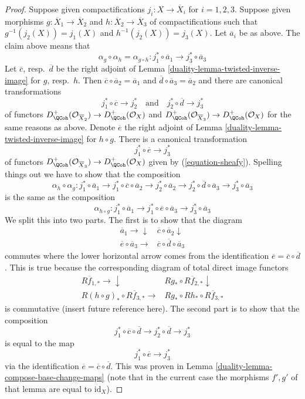 \begin{proof}
\medskip\noindent
Suppose given compactifications $j_i : X \to \overline{X}_i$
for $i = 1, 2, 3$.  Suppose given morphisms
$g : \overline{X}_1 \to \overline{X}_2$ and
$h : \overline{X}_2 \to \overline{X}_3$ of compactifications
such that $g^{-1}(j_2(X)) = j_1(X)$ and $h^{-1}(j_2(X)) = j_3(X)$.
Let $\overline{a}_i$ be as above. The claim above means that
$$
\alpha_g \circ \alpha_h = \alpha_{g \circ h} :
j_1^* \circ \overline{a}_1 \to j_3^* \circ \overline{a}_3
$$
Let $\overline{c}$, resp.\ $\overline{d}$ be the right adjoint of
Lemma \ref{duality-lemma-twisted-inverse-image} for $g$, resp.\ $h$.
Then $\overline{c} \circ \overline{a}_2 = \overline{a}_1$ and
$\overline{d} \circ \overline{a}_3 = \overline{a}_2$
and there are canonical transformations
$$
j_1^* \circ \overline{c} \longrightarrow j_2^*
\quad\text{and}\quad
j_2^* \circ \overline{d} \longrightarrow j_3^*
$$
of functors
$D^+_\QCoh(\mathcal{O}_{\overline{X}_2}) \to D^+_\QCoh(\mathcal{O}_X)$
and
$D^+_\QCoh(\mathcal{O}_{\overline{X}_3}) \to D^+_\QCoh(\mathcal{O}_X)$
for the same reasons as above. Denote $\overline{e}$ the
right adjoint of Lemma \ref{duality-lemma-twisted-inverse-image}
for $h \circ g$. There is a canonical transformation
$$
j_1^* \circ \overline{e} \longrightarrow j_3^*
$$
of functors
$D^+_\QCoh(\mathcal{O}_{\overline{X}_3}) \to D^+_\QCoh(\mathcal{O}_X)$
given by (\ref{equation-sheafy}). Spelling things out we have to
show that the composition
$$
\alpha_h \circ \alpha_g :
j_1^* \circ \overline{a}_1 \to
j_1^* \circ \overline{c} \circ \overline{a}_2 \to
j_2^* \circ \overline{a}_2 \to
j_2^* \circ \overline{d} \circ \overline{a}_3 \to
j_3^* \circ \overline{a}_3
$$
is the same as the composition
$$
\alpha_{h \circ g} :
j_1^* \circ \overline{a}_1 \to
j_1^* \circ \overline{e} \circ \overline{a}_3 \to
j_3^* \circ \overline{a}_3
$$
We split this into two parts. The first is to show that the diagram
$$
\begin{array}{cc}\overline{a}_1 \longrightarrow\downarrow & \overline{c} \circ \overline{a}_2 \downarrow \\ \overline{e} \circ \overline{a}_3 \longrightarrow & \overline{c} \circ \overline{d} \circ \overline{a}_3\end{array}
$$
commutes where the lower horizontal arrow comes from the identification
$\overline{e} = \overline{c} \circ \overline{d}$. This is true
because the corresponding diagram of total direct image functors
$$
\begin{array}{cc}R\overline{f}_{1, *} \longrightarrow\downarrow & Rg_* \circ R\overline{f}_{2, *} \downarrow \\ R(h \circ g)_* \circ R\overline{f}_{3, *} \longrightarrow & Rg_* \circ Rh_* \circ R\overline{f}_{3, *}\end{array}
$$
is commutative (insert future reference here). The second part
is to show that the composition
$$
j_1^* \circ \overline{c} \circ \overline{d} \to
j_2^* \circ \overline{d} \to j_3^*
$$
is equal to the map
$$
j_1^* \circ \overline{e} \to j_3^*
$$
via the identification $\overline{e} = \overline{c} \circ \overline{d}$.
This was proven in Lemma \ref{duality-lemma-compose-base-change-maps}
(note that in the current case the morphisms $f', g'$ of that
lemma are equal to $\text{id}_X$).
\end{proof}

